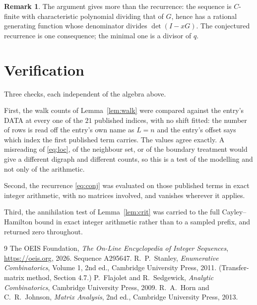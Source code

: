 \documentclass[11pt,a4paper]{article}
\theoremstyle{plain}
\theoremstyle{definition}
\newtheorem{remark}[theorem]{Remark}
\begin{document}
\begin{remark}
The argument gives more than the recurrence: the sequence is $C$-finite with characteristic
polynomial dividing that of $G$, hence has a rational generating function whose denominator
divides $\det(I-xG)$. The conjectured recurrence is one consequence; the minimal one is a
divisor of $q$.
\end{remark}

\section{Verification}

Three checks, each independent of the algebra above.

First, the walk counts of Lemma~\ref{lem:walk} were compared against the entry's DATA at
every one of the $21$ published indices, with no shift fitted: the number of rows is
read off the entry's own name as $L=n$ and the entry's offset says which index the first
published term carries. The values agree exactly. A misreading of \eqref{eq:loc}, of the
neighbour set, or of the boundary treatment would give a different digraph and different
counts, so this is a test of the modelling and not only of the arithmetic.

Second, the recurrence \eqref{eq:conj} was evaluated on those published terms in exact
integer arithmetic, with no matrices involved, and vanishes wherever it applies.

Third, the annihilation test of Lemma~\ref{lem:crit} was carried to the full
Cayley--Hamilton bound in exact integer arithmetic rather than to a sampled prefix, and
returned zero throughout.

\begin{thebibliography}{9}
 The OEIS Foundation, \emph{The On-Line Encyclopedia of Integer
Sequences}, \url{https://oeis.org}, 2026. Sequence A295647.
 R.~P.~Stanley, \emph{Enumerative Combinatorics}, Volume 1, 2nd ed.,
Cambridge University Press, 2011. (Transfer-matrix method, Section 4.7.)
 P.~Flajolet and R.~Sedgewick, \emph{Analytic Combinatorics}, Cambridge
University Press, 2009.
 R.~A.~Horn and C.~R.~Johnson, \emph{Matrix Analysis}, 2nd ed., Cambridge
University Press, 2013.
\end{thebibliography}
\end{document}
